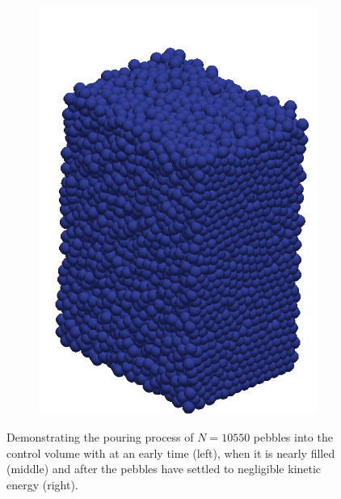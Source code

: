 \begin{figure}[!ht]
\begin{subfigure}[b]{0.25\textwidth}
		\includegraphics[width=\textwidth]{chapters/figures/fill03.png}
	\end{subfigure}
	\caption{Demonstrating the pouring process of $N = 10550$ pebbles into the control volume with at an early time (left), when it is nearly filled (middle) and after the pebbles have settled to negligible kinetic energy (right).}
\label{fig:fill01}
\end{figure}

